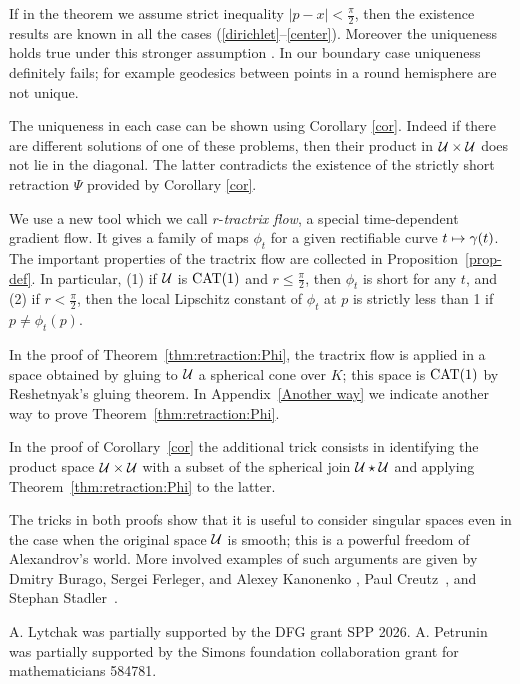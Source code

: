 \documentclass[oneside,a4paper, 12pt]{article}
\begin{document}
If in the theorem we assume strict inequality $|p-x|< \tfrac\pi2$, then the existence results are known  in all the cases (\ref{dirichlet}--\ref{center}).
Moreover the uniqueness holds true under this stronger assumption
\cite{yokota,serbinowski}.
In our boundary case uniqueness definitely fails;
for example geodesics between points in a round hemisphere are not unique.

The uniqueness in each case can be shown using Corollary \ref{cor}.
Indeed if there are different solutions of one of these problems, then their product in ${\mathcal{U}}\times {\mathcal{U}}$ does not lie in the diagonal.
The latter contradicts the existence of the strictly short retraction $\Psi$ provided by Corollary \ref{cor}.

We use a new tool which we call $r$-\emph{tractrix flow}, a special  time-dependent gradient flow.
It gives a family of maps $\phi_t$ for a given rectifiable curve $t\z\mapsto\gamma(t)$.
The important properties of the tractrix flow are collected in Proposition~\ref{prop-def}.
In particular, (1) if $\mathcal{U}$ is $\mathrm{CAT}(1)$ and $r\le \tfrac\pi2$, then $\phi_t$ is short for any $t$, 
and (2) if $r< \tfrac\pi2$, then the local Lipschitz constant of $\phi_t$ at $p$ is strictly less than 1 if $p\ne \phi_t(p)$.

In the proof of Theorem~\ref{thm:retraction:Phi}, the tractrix flow is applied in a space obtained by gluing to $\mathcal{U}$ a spherical cone over $K$;
this space is $\mathrm{CAT}(1)$ by Reshetnyak's gluing theorem.
In Appendix~\ref{Another way} we indicate another way to prove Theorem~\ref{thm:retraction:Phi}.

In the proof of Corollary~\ref{cor} the additional trick consists in identifying the product space $\spc{U}\z\times \spc{U}$ with a subset of the spherical join $\mathcal{U}\star \mathcal{U}$ and applying Theorem~\ref{thm:retraction:Phi} to the latter.

The tricks in both proofs show that it is useful to consider singular spaces even in the case when the original space $\mathcal{U}$ is smooth;
this is a powerful freedom of Alexandrov's world.
More involved examples of such arguments are given by Dmitry Burago, Sergei Ferleger, and Alexey Kanonenko \cite{BFK}, Paul Creutz~\cite{creutz}, and Stephan Stadler~\cite{stadler}. 

 A. Lytchak was partially supported by the DFG grant SPP 2026.
A. Petrunin was partially supported by the Simons foundation collaboration grant for mathematicians 584781.
\end{document}
